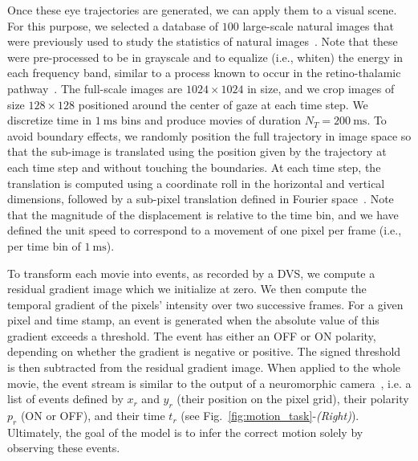\documentclass[default]{sn-jnl}%
\theoremstyle{thmstyleone}%
\theoremstyle{thmstyletwo}%
\theoremstyle{thmstylethree}%
\newcommand{\seeFig}[1]{see Fig.~\ref{fig:#1}}%
\newcommand{\ms}{\si{\milli\second}}%
\newcommand{\arank}{r} %
\newcommand{\timev}{t} %
\newcommand{\polev}{p} %
\begin{document}
Once these eye trajectories are generated, we can apply them to a visual scene. For this purpose, we selected a database of $100$ large-scale natural images that were previously used to study the statistics of natural images~\citep{vanHateren1998}. Note that these were pre-processed to be in grayscale and to equalize (i.e., whiten) the energy in each frequency band, similar to a process known to occur in the retino-thalamic pathway~\citep{dan_efficient_1996}. The full-scale images are $1024 \times 1024$ in size, and we crop images of size $128 \times 128$ positioned around the center of gaze at each time step. We discretize time in $1~\ms$ bins and produce movies of duration $N_T = 200~\ms$. To avoid boundary effects, we randomly position the full trajectory in image space so that the sub-image is translated using the position given by the trajectory at each time step and without touching the boundaries. At each time step, the translation is computed using a coordinate roll in the horizontal and vertical dimensions, followed by a sub-pixel translation defined in Fourier space~\citep{perrinet_sparse_2015}. Note that the magnitude of the displacement is relative to the time bin, and we have defined the unit speed to correspond to a movement of one pixel per frame (i.e., per time bin of $1~\ms$).

To transform each movie into events, as recorded by a DVS, we compute a residual gradient image which we initialize at zero. We then compute the temporal gradient of the pixels' intensity over two successive frames. For a given pixel and time stamp, an event is generated when the absolute value of this gradient exceeds a threshold. The event has either an OFF or ON polarity, depending on whether the gradient is negative or positive. The signed threshold is then subtracted from the residual gradient image. When applied to the whole movie, the event stream is similar to the output of a neuromorphic camera~\citep{Gallego2022}, i.e. a list of events defined by $x_\arank$ and $y_\arank$ (their position on the pixel grid), their polarity $\polev_\arank$ (ON or OFF), and their time $\timev_\arank$ (\seeFig{motion_task}-\textit{(Right)}). Ultimately, the goal of the model is to infer the correct motion solely by observing these events.
\end{document}
